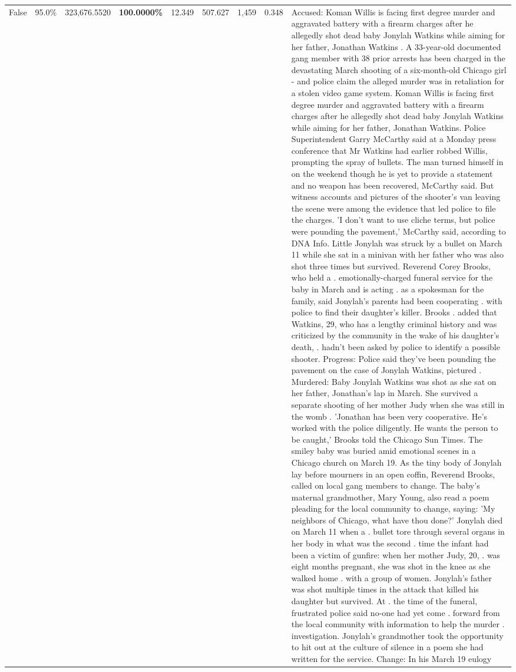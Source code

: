 \begin{table}[H]
\begin{tabular}{lllrlllll}
False & 95.0\% & 323,676.5520 & \bfseries \color{red} 100.0000\% & 12.349 & 507.627 & 1,459 & 0.348 & Accused: Koman Willis is facing first degree murder and aggravated battery with a firearm charges after he allegedly shot dead baby Jonylah Watkins while aiming for her father, Jonathan Watkins . A 33-year-old documented gang member with 38 prior arrests has been charged in the devastating March shooting of a six-month-old Chicago girl - and police claim the alleged murder was in retaliation for a stolen video game system. Koman Willis is facing first degree murder and aggravated battery with a firearm charges after he allegedly shot dead baby Jonylah Watkins while aiming for her father, Jonathan Watkins. Police Superintendent Garry McCarthy said at a Monday press conference that Mr Watkins had earlier robbed Willis, prompting the spray of bullets. The man turned himself in on the weekend though he is yet to provide a statement and no weapon has been recovered, McCarthy said. But witness accounts and pictures of the shooter's van leaving the scene were among the evidence that led police to file the charges. 'I don't want to use cliche terms, but police were pounding the pavement,' McCarthy said, according to DNA Info. Little Jonylah was struck by a bullet on March 11 while she sat in a minivan with her father who was also shot three times but survived. Reverend Corey Brooks, who held a . emotionally-charged funeral service for the baby in March and is acting . as a spokesman for the family, said Jonylah's parents had been cooperating . with police to find their daughter's killer. Brooks . added that Watkins, 29, who has a lengthy criminal history and was criticized by the community in the wake of his daughter's death, . hadn't been asked by police to identify a possible shooter. Progress: Police said they've been pounding the pavement on the case of Jonylah Watkins, pictured . Murdered: Baby Jonylah Watkins was shot as she sat on her father, Jonathan's lap in March. She survived a separate shooting of her mother Judy when she was still in the womb . 'Jonathan has been very cooperative. He's worked with the police diligently. He wants the person to be caught,' Brooks told the Chicago Sun Times. The smiley baby was buried amid emotional scenes in a Chicago church on March 19. As the tiny body of Jonylah lay before mourners in an open coffin, Reverend Brooks, called on local gang members to change. The baby's maternal grandmother, Mary Young, also read a poem pleading for the local community to change, saying: 'My neighbors of Chicago, what have thou done?' Jonylah died on March 11 when a . bullet tore through several organs in her body in what was the second . time the infant had been a victim of gunfire: when her mother Judy, 20, . was eight months pregnant, she was shot in the knee as she walked home . with a group of women. Jonylah's father was shot multiple times in the attack that killed his daughter but survived. At . the time of the funeral, frustrated police said no-one had yet come . forward from the local community with information to help the murder . investigation. Jonylah's grandmother took the opportunity to hit out at the culture of silence in a poem she had written for the service. Change: In his March 19 eulogy 
\end{tabular}
\end{table}
